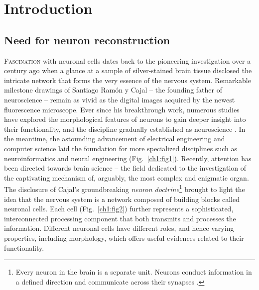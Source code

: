 %
%
\chpos{22mm}{10mm}

\chapter[Introduction]{Introduction}
\label{ch1:introduction}


\section{Need for neuron reconstruction}
\label{sec:neuron-cell}
\lettrine{F}{ascination} with neuronal cells dates back to the pioneering investigation over a century ago when a glance at a sample of silver-stained brain tissue disclosed the intricate network that forms the very essence of the nervous system. Remarkable milestone drawings of Santiago Ram\'{o}n y Cajal \cite{ramon2008histologia, swanson2017} -- the founding father of neuroscience -- remain as vivid as the digital images acquired by the newest fluorescence microscope. Ever since his breakthrough work, numerous studies \cite{ascoli2001computer, defelipe2002microstructure, defelipe1992pyramidal, van2001need, scorcioni2004quantitative, mason2007initiation, gensel2010semi, markram2015reconstruction} have explored the morphological features of neurons to gain deeper insight into their functionality, and the discipline gradually established as neuroscience \cite{kandel2000principles}. In the meantime, the astounding advancement of electrical engineering and computer science laid the foundation for more specialized disciplines such as neuroinformatics and neural engineering (Fig.~\ref{ch1:fig1}). Recently, attention has been directed towards brain science -- the field dedicated to the investigation of the captivating mechanism of, arguably, the most complex and enigmatic organ. The disclosure of Cajal's groundbreaking \textit{neuron doctrine}\footnote{Every neuron in the brain is a separate unit. Neurons conduct information in a defined direction and communicate across their synapses \cite{glickstein2006golgi}.} brought to light the idea that the nervous system is a network composed of building blocks called neuronal cells. Each cell (Fig.~\ref{ch1:fig2}) further represents a sophisticated, interconnected processing component that both transmits and processes the information. Different neuronal cells have different roles, and hence varying properties, including morphology, which offers useful evidences related to their functionality.

